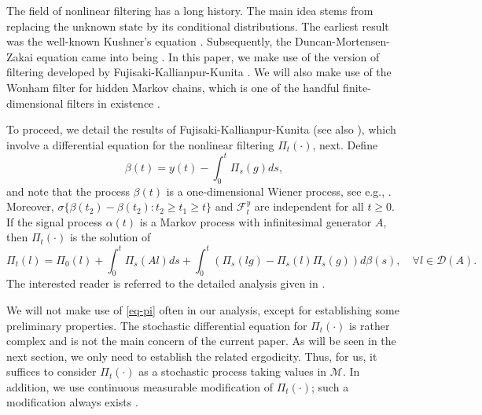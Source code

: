 \documentclass[12pt]{amsart}
\theoremstyle{remark}
\numberwithin{equation}{section}
\newcommand{\M}{\mathcal{M}}
\newcommand{\F}{\mathcal{F}}
\numberwithin{equation}{section}
\newcommand{\1}{\boldsymbol{1}}
\begin{document}

The field of nonlinear filtering has a long history.
The main idea stems from replacing  the unknown state by its conditional distributions. The earliest result was the well-known Kushner's equation
\cite{Kushner64}. Subsequently, the Duncan-Mortensen-Zakai equation came into being
\cite{Duncan,Mortensen,Zakai}. In this paper, we make use of the version of filtering developed by
Fujisaki-Kallianpur-Kunita \cite{FFK72}. We will also make use of the Wonham filter for hidden Markov chains, which is one of the handful finite-dimensional filters in existence \cite{Won65}.

To proceed,
we detail the results of
Fujisaki-Kallianpur-Kunita \cite{FFK72} (see also \cite{KS69}), which involve
a differential equation for the nonlinear filtering $\Pi_t(\cdot)$, next.
Define
$$
\beta(t)=y(t)-\int_0^t \Pi_s(g)ds,
$$
and note that the process $\beta(t)$ is a one-dimensional Wiener process, see e.g., \cite[Theorem 7.2]{LS01}.
Moreover, $
\sigma\{\beta(t_2)-\beta(t_2):t_2\geq t_1\geq t\}$ and $\F_t^y$ are independent for all $t\geq 0.$
If the signal process $\alpha(t)$ is a Markov process with infinitesimal generator $A$, then $\Pi_t(\cdot)$ is the solution of
\begin{equation}\label{eq-pi}
\Pi_t(l)=\Pi_0(l)+\int_0^t\Pi_s(Al)ds+\int_0^t \left( \Pi_s(lg)-\Pi_s(l)\Pi_s(g)\right)d\beta(s),\quad\forall l\in\mathcal D(A).
\end{equation}
The interested reader is referred to the detailed analysis given in \cite{FFK72,KS69}.

We will not make use of \eqref{eq-pi} often in our analysis, except for establishing some preliminary properties.
The stochastic differential equation for $\Pi_t(\cdot)$ is
rather complex and is not the main concern of the current paper.
As will be seen in the next section, we only need
to establish the related ergodicity. Thus,
for us, it suffices to consider
$\Pi_t(\cdot)$ as a stochastic process taking values in $\M$.
In addition,
we use
continuous measurable modification of $\Pi_t(\cdot)$;
such a modification always exists
\cite{Kun71}.
\end{document}
